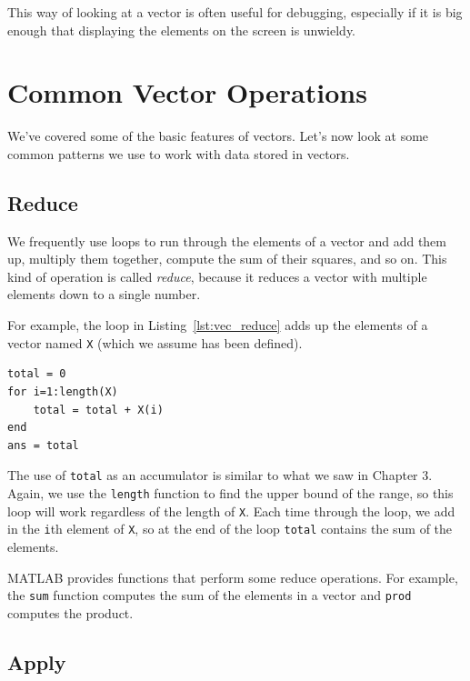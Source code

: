 This way of looking at a vector is often useful for debugging, especially
if it is big enough that displaying the elements on
the screen is unwieldy.


\section{Common Vector Operations}

We've covered some of the basic features of vectors. Let's now look at some common patterns we use to work with data stored in vectors.

\subsection{Reduce}
\label{reduce}

We frequently use loops to run through the elements of a vector
and add them up, multiply them together, compute the sum
of their squares, and so on.  This kind of operation is called \emph{reduce},
because it reduces a vector with multiple elements down to a single
number.


For example, the loop in Listing~\ref{lst:vec_reduce} adds up the elements of a vector named {\tt X} (which we assume has been defined).

\begin{lstlisting}[caption={Reducing a vector to a single scalar value (the sum)}, label={lst:vec_reduce}]
total = 0
for i=1:length(X)
    total = total + X(i)
end
ans = total
\end{lstlisting}

The use of {\tt total} as an accumulator is similar to what we
saw in Chapter 3.  Again, we use the {\tt length} function
to find the upper bound of the range, so this loop will work
regardless of the length of {\tt X}.
Each time through the loop, we add
in the {\tt i}th element of {\tt X}, so at the end of the loop
{\tt total} contains the sum of the elements.


MATLAB provides functions that perform some reduce operations.
For example, the {\tt sum} function computes the sum of the elements
in a vector and {\tt prod} computes the product.


\subsection{Apply}
\label{apply}

